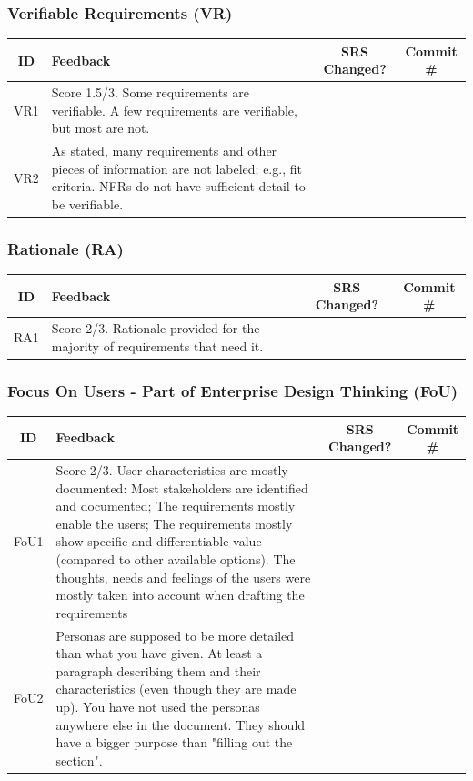 \documentclass{article}
\begin{document}
\subsubsection{Verifiable Requirements (VR)}
\begin{table}[h!]
\centering
\begin{tabular}{|c|p{8cm}|c|c|}
\hline
\textbf{ID} & \textbf{Feedback} & \textbf{SRS Changed?} & \textbf{Commit \#} \\ \hline
VR1 & Score 1.5/3. Some requirements are verifiable. A few requirements are verifiable, but most are not. & & \\ \hline
VR2 & As stated, many requirements and other pieces of information are not labeled; e.g., fit criteria. NFRs do not have sufficient detail to be verifiable. & & \\ \hline
\end{tabular}
\end{table}

\subsubsection{Rationale (RA)}
\begin{table}[h!]
\centering
\begin{tabular}{|c|p{8cm}|c|c|}
\hline
\textbf{ID} & \textbf{Feedback} & \textbf{SRS Changed?} & \textbf{Commit \#} \\ \hline
RA1 & Score 2/3. Rationale provided for the majority of requirements that need it. & & \\ \hline
\end{tabular}
\end{table}

\subsubsection{Focus On Users - Part of Enterprise Design Thinking (FoU)}
\begin{table}[h!]
\centering
\begin{tabular}{|c|p{8cm}|c|c|}
\hline
\textbf{ID} & \textbf{Feedback} & \textbf{SRS Changed?} & \textbf{Commit \#} \\ \hline
FoU1 & Score 2/3. User characteristics are mostly documented: Most stakeholders are identified and documented; The requirements mostly enable the users; The requirements mostly show specific and differentiable value (compared to other available options). The thoughts, needs and feelings of the users were mostly taken into account when drafting the requirements & & \\ \hline
FoU2 & Personas are supposed to be more detailed than what you have given. At least a paragraph describing them and their characteristics (even though they are made up). You have not used the personas anywhere else in the document. They should have a bigger purpose than "filling out the section". & & \\ \hline
\end{tabular}
\end{table}
\end{document}
